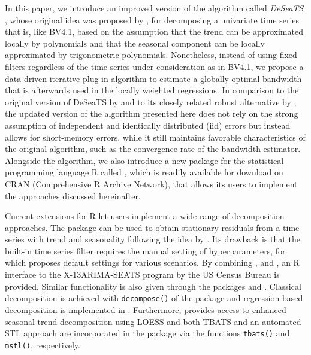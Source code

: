 In this paper, we introduce an improved version of the algorithm called \emph{DeSeaTS} \citep[deseasonalize time series,][]{feng2013seasonal}, whose original idea was proposed by \citet{feng1999kernel}, for decomposing a univariate time series that is, like BV4.1, based on the assumption that the trend can be approximated locally by polynomials and that the seasonal component can be locally approximated by trigonometric polynomials. Nonetheless, instead of using fixed filters regardless of the time series under consideration as in BV4.1, we propose a data-driven iterative plug-in \citep[IPI,][]{gasser1991ipi} algorithm to estimate a globally optimal bandwidth that is afterwards used in the locally weighted regressions. In comparison to the original version of DeSeaTS by \citet{feng2013seasonal} and to its closely related robust alternative by \citet{heiler2004robust}, the updated version of the algorithm presented here does not rely on the strong assumption of independent and identically distributed (iid) errors but instead allows for short-memory errors, while it still maintains favorable characteristics of the original algorithm, such as the convergence rate of the bandwidth estimator. Alongside the algorithm, we also introduce a new package for the statistical programming language R \citep{rcore2022rlang} called  \citep[version 1.1.2]{feng2023deseats}, which is readily available for download on CRAN (Comprehensive R Archive Network), that allows its users to implement the approaches discussed hereinafter.

Current extensions for R let users implement a wide range of decomposition approaches. The package  \citep{shea2021hamilton} can be used to obtain stationary residuals from a time series with trend and seasonality following the idea by \citet{hamilton2018you}. Its drawback is that the built-in time series filter requires the manual setting of hyperparameters, for which \citet{hamilton2018you} proposes default settings for various scenarios. By combining  \citep{eddelbuettel2022x13},  \citep{sax2018seasonal} and  \citep{sax2017seasonalview}, an R interface to the X-13ARIMA-SEATS program by the US Census Bureau is provided. Similar functionality is also given through the packages  \citep{kowarik2014x12} and  \citep{quartier2024rjdemetra}. Classical decomposition is achieved with \texttt{decompose()} of the package  \citep{rcore2022rlang} and regression-based decomposition is implemented in  \citep{dokumentov2022stR}. Furthermore,  \citep{hafen2016stlplus} provides access to enhanced seasonal-trend decomposition using LOESS \citep[STL,][]{cleveland1990stl} and both TBATS \citep[trigonometric seasonality, Box-Cox transformation, ARMA errors, trend and seasonal components,][]{de_livera2011forecasting} and an automated STL approach are incorporated in the package  \citep{hyndman2008forecast} via the functions \texttt{tbats()} and \texttt{mstl()}, respectively.

